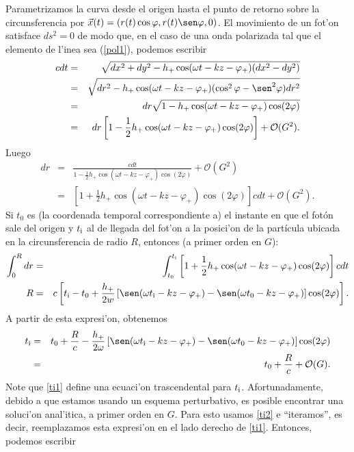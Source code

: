 Parametrizamos la curva desde el origen hasta el punto de retorno sobre la circunsferencia por $\vec{x}(t)=(r(t)\cos\varphi,r(t)\sen\varphi,0)$. El movimiento de un fot'on satisface $ds^2=0$ de modo que, en el caso de una onda polarizada tal que el elemento de l'inea sea (\ref{pol1}), podemos escribir
 \begin{eqnarray}
 cdt&=&\sqrt{dx^2+dy^2-h_+\cos(\omega t-kz-\varphi_+)(dx^2-dy^2)}\\
 &=&\sqrt{dr^2-h_+\cos(\omega t-kz-\varphi_+)(\cos^2\varphi-\sen^2\varphi)dr^2}\\
 &=&dr\sqrt{1-h_+\cos(\omega t-kz-\varphi_+)\cos(2\varphi)}\\
 &=&dr\left[1-\frac{1}{2}h_+\cos(\omega t-kz-\varphi_+)\cos(2\varphi)\right]+\mathcal{O}(G^2). \label{dr}
 \end{eqnarray}
Luego
\begin{eqnarray}
dr&=&\frac{cdt}{1-\frac{1}{2}h_+\cos(\omega t-kz-\varphi_+)\cos(2\varphi)}+\mathcal{O}(G^2)\\
&=&\left[1+\frac{1}{2}h_+\cos(\omega t-kz-\varphi_+)\cos(2\varphi) \right]cdt+\mathcal{O}(G^2).
\end{eqnarray}
Si $t_0$ es (la coordenada temporal correspondiente a) el instante en que el fot\'on sale del origen y $t_{\rm i}$ al de llegada del fot'on a la posici'on de la part\'icula ubicada en la circunsferencia de radio $R$, entonces (a primer orden en $G$):
\begin{eqnarray}
\int_{0}^{R}dr&=&\int_{t_0}^{t_{\rm i}}\left[1+\frac{1}{2}h_+\cos(\omega t-kz-\varphi_+)\cos(2\varphi) \right]cdt\\
R&=&c\left[t_{\rm i}-t_{0}+\frac{h_+}{2w}\left[\sen(\omega t_{\rm i}-kz-\varphi_+)-\sen(\omega t_0-kz-\varphi_+)\right]\cos(2\varphi) \right].
\end{eqnarray}
A partir de esta expresi'on, obtenemos
\begin{eqnarray}
t_{\rm i}&=&t_0+\frac{R}{c}-\frac{h_+}{2\omega}\left[\sen(\omega t_{\rm i}-kz-\varphi_+)-\sen(\omega t_0-kz-\varphi_+)\right]\cos(2\varphi) \label{ti1}\\
&=&t_0+\frac{R}{c}+\mathcal{O}(G). \label{ti2}
\end{eqnarray}
Note que \eqref{ti1} define una ecuaci'on trascendental para $t_{\rm i}$. Afortunadamente, debido a que estamos usando un esquema perturbativo, es posible encontrar una soluci'on anal'itica, a primer orden en $G$. Para esto usamos \eqref{ti2} e ``iteramos'', es decir, reemplazamos esta expresi'on en el lado derecho de \eqref{ti1}. Entonces, podemos escribir
